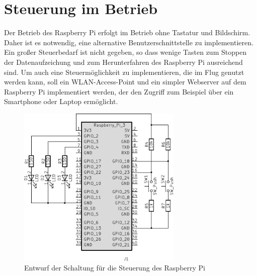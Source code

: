 \documentclass[a4paper,12pt,bibliography=totoc, listof=totoc,titlepage,pointlessnumbers]{scrreprt}
\begin{document}
\section{Steuerung im Betrieb}
\label{s:steuermodul}
Der Betrieb des Raspberry Pi erfolgt im Betrieb ohne Tastatur und Bildschirm. Daher ist es notwendig, eine alternative Benutzerschnittstelle zu implementieren. Ein großer Steuerbedarf ist nicht gegeben, so dass wenige Tasten zum Stoppen der Datenaufzeichung und zum Herunterfahren des Raspberry Pi ausreichend sind. Um auch eine Steuermöglichkeit zu implementieren, die im Flug genutzt werden kann, soll ein WLAN-Access-Point und ein simpler Webserver auf dem Raspberry Pi implementiert werden, der den Zugriff zum Beispiel über ein Smartphone oder Laptop ermöglicht.

\begin{figure}
 \centering
 \includegraphics[width=0.7\textwidth]{img/schaltplanRasp.pdf}
 \caption{Entwurf der Schaltung für die Steuerung des Raspberry Pi}
 \label{abb:steuerung}
\end{figure}
\end{document}
